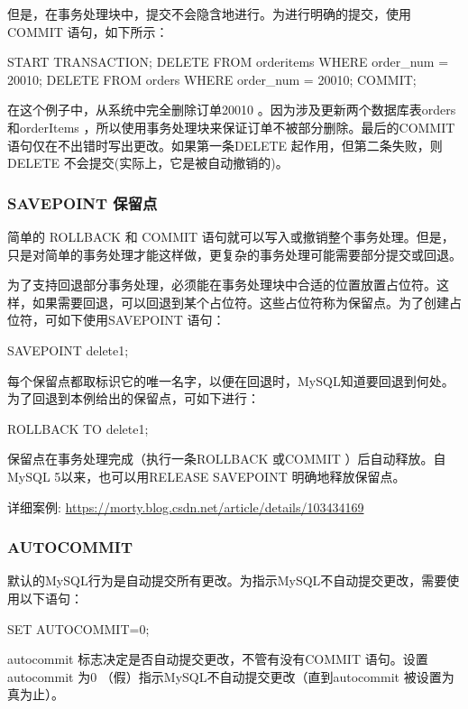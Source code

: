 但是，在事务处理块中，提交不会隐含地进行。为进行明确的提交，使用COMMIT 语句，如下所示：

\begin{sql}
START TRANSACTION;
DELETE FROM orderitems WHERE order_num = 20010;
DELETE FROM orders WHERE order_num = 20010;
COMMIT;
\end{sql}

在这个例子中，从系统中完全删除订单20010 。因为涉及更新两个数据库表orders 和orderItems ，所以使用事务处理块来保证订单不被部分删除。最后的COMMIT 语句仅在不出错时写出更改。如果第一条DELETE 起作用，但第二条失败，则DELETE 不会提交(实际上，它是被自动撤销的)。

\subsubsection{SAVEPOINT 保留点}

简单的 ROLLBACK 和 COMMIT 语句就可以写入或撤销整个事务处理。但是，只是对简单的事务处理才能这样做，更复杂的事务处理可能需要部分提交或回退。

为了支持回退部分事务处理，必须能在事务处理块中合适的位置放置占位符。这样，如果需要回退，可以回退到某个占位符。这些占位符称为保留点。为了创建占位符，可如下使用SAVEPOINT 语句：

\begin{sql}
SAVEPOINT delete1;
\end{sql}

每个保留点都取标识它的唯一名字，以便在回退时，MySQL知道要回退到何处。为了回退到本例给出的保留点，可如下进行：

\begin{sql}
ROLLBACK TO delete1;
\end{sql}

保留点在事务处理完成（执行一条ROLLBACK 或COMMIT ）后自动释放。自MySQL 5以来，也可以用RELEASE SAVEPOINT 明确地释放保留点。

详细案例: \url{https://morty.blog.csdn.net/article/details/103434169}

\subsubsection{AUTOCOMMIT}

默认的MySQL行为是自动提交所有更改。为指示MySQL不自动提交更改，需要使用以下语句：

\begin{sql}
SET AUTOCOMMIT=0;
\end{sql}

autocommit 标志决定是否自动提交更改，不管有没有COMMIT 语句。设置autocommit 为0 （假）指示MySQL不自动提交更改（直到autocommit 被设置为真为止）。

